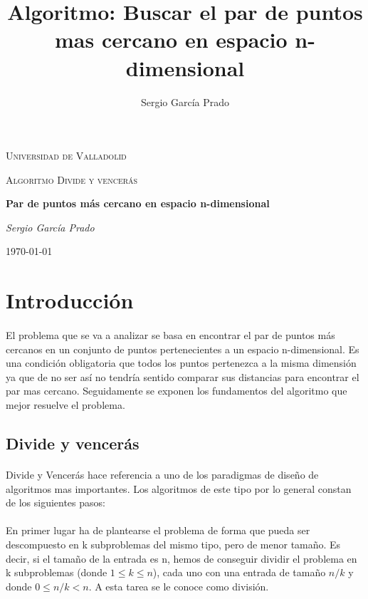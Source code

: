 \documentclass{article}
\title{Algoritmo: Buscar el par de puntos mas cercano en espacio n-dimensional}
\author{Sergio García Prado}
\begin{document}
\begin{titlepage}
	\centering
	{\scshape\LARGE Universidad de Valladolid \par}
	\vspace{1cm}
	{\scshape\Large Algoritmo Divide y vencerás\par}
	\vspace{1.5cm}
	{\huge\bfseries Par de puntos más cercano en espacio n-dimensional\par}
	\vspace{2cm}
	{\Large\itshape Sergio García Prado\par}


	{\large \today\par}
\end{titlepage}

\section{Introducción}

	\paragraph{}
	El problema que se va a analizar se basa en encontrar el par de puntos más cercanos en un conjunto de puntos pertenecientes a un espacio n-dimensional. Es una condición obligatoria que todos los puntos pertenezca a la misma dimensión ya que de no ser así no tendría sentido comparar sus distancias para encontrar el par mas cercano. Seguidamente se exponen los fundamentos del algoritmo que mejor resuelve el problema.
	
	\subsection{Divide y vencerás}
		
		\paragraph{}
		Divide y Vencerás hace referencia a uno de los paradigmas de diseño de algoritmos mas importantes. Los algoritmos de este tipo por lo general constan de los siguientes pasos:
		
		\paragraph{}
		En primer lugar ha de plantearse el problema de forma que pueda ser descompuesto en k subproblemas del mismo tipo, pero de menor tamaño. Es decir, si el tamaño de la entrada es n, hemos de conseguir dividir el problema en k subproblemas (donde $1 \leq k \leq n$), cada uno con una entrada de tamaño $n/k$ y donde $0 \leq n/k < n$. A esta tarea se le conoce como división.
		
\end{document}
